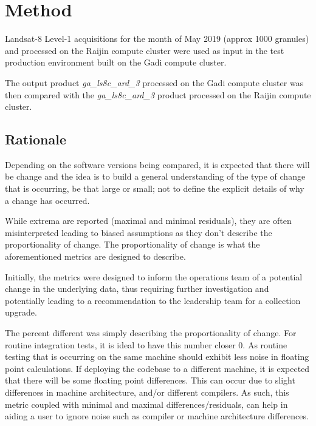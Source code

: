 \documentclass[a4paper]{article}
\begin{document}
    \section{Method}

      \begin{flushleft}
        Landsat-8 Level-1 acquisitions for the month of May 2019 (approx 1000 granules) and processed on the Raijin compute cluster were used as input in the test production environment built on the Gadi compute cluster. \par
        The output product \textit{ga\_ls8c\_ard\_3} processed on the Gadi compute cluster was then compared with the \textit{ga\_ls8c\_ard\_3} product processed on the Raijin compute cluster.
      \end{flushleft}

    \subsection{Rationale}

      \begin{flushleft}
        Depending on the software versions being compared, it is expected that there will be change and the idea is to build a general understanding of the type of change that is occurring, be that large or small; not to define the explicit details of why a change has occurred. \par
        While extrema are reported (maximal and minimal residuals), they are often misinterpreted leading to biased assumptions as they don't describe the proportionality of change. The proportionality of change is what the aforementioned metrics are designed to describe. \par
        Initially, the metrics were designed to inform the operations team of a potential change in the underlying data, thus requiring further investigation and potentially leading to a recommendation to the leadership team for a collection upgrade. \par
        The percent different was simply describing the proportionality of change. For routine integration tests, it is ideal to have this number closer 0. As routine testing that is occurring on the same machine should exhibit less noise in floating point calculations. If deploying the codebase to a different machine, it is expected that there will be some floating point differences. This can occur due to slight differences in machine architecture, and/or different compilers. As such, this metric coupled with minimal and maximal differences/residuals, can help in aiding a user to ignore noise such as compiler or machine architecture differences. \par
      \end{flushleft}
\end{document}

